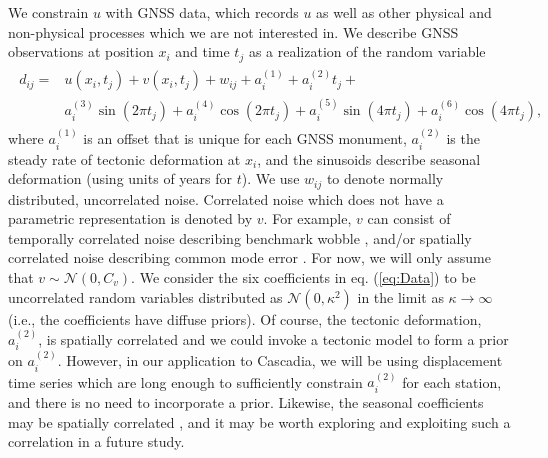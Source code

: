 \documentclass[10pt,letter]{article}
\begin{document}
We constrain $u$ with GNSS data, which records $u$ as well as other physical and non-physical processes which we are not interested in. We describe GNSS observations at position $x_i$ and time $t_j$ as a realization of the random variable 
\begin{align}\label{eq:Data}
\begin{split}
d_{ij} = &u(x_i,t_j) + v(x_i,t_j) + w_{ij} + a^{(1)}_i + a^{(2)}_it_j + \\
         &a^{(3)}_i\sin(2 \pi t_j) + a^{(4)}_i\cos(2 \pi t_j) + a^{(5)}_i\sin(4 \pi t_j) + a^{(6)}_i\cos(4 \pi t_j), 
\end{split}
\end{align}
where $a^{(1)}_{i}$ is an offset that is unique for each GNSS monument, $a^{(2)}_{i}$ is the steady rate of tectonic deformation at $x_i$, and the sinusoids describe seasonal deformation (using units of years for $t$). We use $w_{ij}$ to denote normally distributed, uncorrelated noise. Correlated noise which does not have a parametric representation is denoted by $v$.  For example, $v$ can consist of temporally correlated noise describing benchmark wobble \citep[e.g.,][]{Wyatt1982,Wyatt1989}, and/or spatially correlated noise describing common mode error \citep[e.g.,][]{Wdowinski1997}. For now, we will only assume that $v \sim \mathcal{N}(0,C_v)$. We consider the six coefficients in eq. (\ref{eq:Data}) to be uncorrelated random variables distributed as $\mathcal{N}(0,\kappa^2)$ in the limit as $\kappa \to \infty$ (i.e., the coefficients have diffuse priors). Of course, the tectonic deformation, $a^{(2)}_{i}$, is spatially correlated and we could invoke a tectonic model to form a prior on $a^{(2)}_{i}$. However, in our application to Cascadia, we will be using displacement time series which are long enough to sufficiently constrain $a^{(2)}_{i}$ for each station, and there is no need to incorporate a prior. Likewise, the seasonal coefficients may be spatially correlated \citep{Langbein2008}, and it may be worth exploring and exploiting such a correlation in a future study. 
\end{document}
